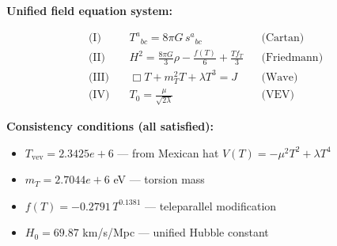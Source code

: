 
\textbf{Unified field equation system:}

\begin{align}
  \text{(I)} \quad & T^a{}_{bc} = 8\pi G \, s^a{}_{bc} && \text{(Cartan)} \\
  \text{(II)} \quad & H^2 = \frac{8\pi G}{3}\rho - \frac{f(T)}{6} + \frac{Tf_T}{3} && \text{(Friedmann)} \\
  \text{(III)} \quad & \Box T + m_T^2 T + \lambda T^3 = J && \text{(Wave)} \\
  \text{(IV)} \quad & T_0 = \frac{\mu}{\sqrt{2\lambda}} && \text{(VEV)}
\end{align}

\textbf{Consistency conditions (all satisfied):}
\begin{itemize}
  \item $T_{\text{vev}} = 2.3425e+6$ — from Mexican hat $V(T) = -\mu^2 T^2 + \lambda T^4$
  \item $m_T = 2.7044e+6$ eV — torsion mass
  \item $f(T) = -0.2791 \, T^{0.1381}$ — teleparallel modification
  \item $H_0 = 69.87$ km/s/Mpc — unified Hubble constant
\end{itemize}